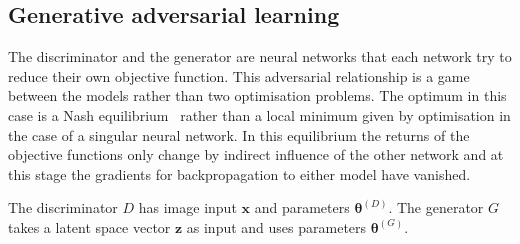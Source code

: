 \documentclass[twocolumn]{article}
\numberwithin{equation}{section}
\begin{document}

\subsection{Generative adversarial learning}
The discriminator and the generator are neural networks that each network try to reduce their own objective function. 
This adversarial relationship is a game between the models rather than two optimisation problems. The optimum in this 
case is a Nash equilibrium~\cite{NIPS16} rather than a local minimum given by optimisation in the case of a singular 
neural network. In this equilibrium the returns of the objective functions only change by indirect influence of the 
other network and at this stage the gradients for backpropagation to either model have vanished.

The discriminator $D$ has image input $\mathbf{x}$ and parameters 
$\bm{\theta}^{(D)}$. The generator $G$ takes a latent space vector $\mathbf{z}$ as input and uses parameters 
$\bm{\theta}^{(G)}$. 
\end{document}
